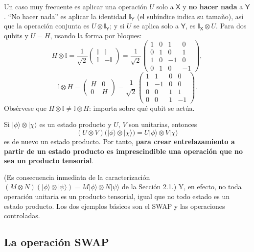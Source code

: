 \documentclass[11pt, a4paper, twoside, openright]{report}
\begin{document}
\noindent Un caso muy frecuente es aplicar una operación $U$ solo a $\mathsf{X}$ y \textbf{no hacer nada} a $\mathsf{Y}$. ``No hacer nada'' es aplicar la identidad $\mathbb{I}_{\mathsf{Y}}$ (el subíndice indica su tamaño), así que la operación conjunta es $U\otimes\mathbb{I}_{\mathsf{Y}}$; y si $U$ se aplica solo a $\mathsf{Y}$, es $\mathbb{I}_{\mathsf{X}}\otimes U$. Para dos qubits y $U = H$, usando la forma por bloques:
\[
H\otimes\mathbb{I} = \frac{1}{\sqrt2}\begin{pmatrix} \mathbb{I} & \mathbb{I} \\ \mathbb{I} & -\mathbb{I}\end{pmatrix} = \frac{1}{\sqrt2}\begin{pmatrix} 1&0&1&0\\0&1&0&1\\1&0&-1&0\\0&1&0&-1\end{pmatrix},
\]
\[
\mathbb{I}\otimes H = \begin{pmatrix} H & 0 \\ 0 & H\end{pmatrix} = \frac{1}{\sqrt2}\begin{pmatrix} 1&1&0&0\\1&-1&0&0\\0&0&1&1\\0&0&1&-1\end{pmatrix}.
\]
Obsérvese que $H\otimes\mathbb{I}\neq\mathbb{I}\otimes H$: importa sobre qué qubit se actúa.

\begin{tcolorbox}[colback=teal!5!white,colframe=teal!75!black,title=\textbf{Proposición: Las operaciones producto no crean entrelazamiento}]
Si $|\phi\rangle\otimes|\chi\rangle$ es un estado producto y $U$, $V$ son unitarias, entonces
\[ (U\otimes V)\big(|\phi\rangle\otimes|\chi\rangle\big) = U|\phi\rangle\otimes V|\chi\rangle \]
es de nuevo un estado producto. Por tanto, \textbf{para crear entrelazamiento a partir de un estado producto es imprescindible una operación que no sea un producto tensorial}.
\end{tcolorbox}

\noindent (Es consecuencia inmediata de la caracterización $(M\otimes N)(|\phi\rangle\otimes|\psi\rangle) = M|\phi\rangle\otimes N|\psi\rangle$ de la Sección 2.1.) Y, en efecto, no toda operación unitaria es un producto tensorial, igual que no todo estado es un estado producto. Los dos ejemplos básicos son el SWAP y las operaciones controladas.

\subsection{La operación SWAP}
\end{document}
